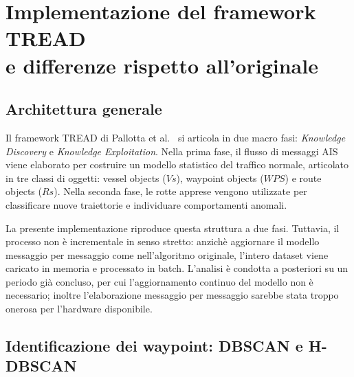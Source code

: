 \section[Implementazione del framework TREAD\texorpdfstring{\protect\newline}{} e differenze rispetto all'originale]%
        {Implementazione del framework TREAD\\ e differenze rispetto all'originale}\label{sec:meth_algorithm}

\subsection{Architettura generale}\label{ssec:meth_architecture}

Il framework TREAD di Pallotta et al.~\cite{pallotta} si articola in due macro fasi: \emph{Knowledge Discovery} e \emph{Knowledge Exploitation}.
Nella prima fase, il flusso di messaggi AIS viene elaborato per costruire un modello statistico del traffico normale, articolato in tre classi
di oggetti: vessel objects ($Vs$), waypoint objects ($WPS$) e route objects ($Rs$).
Nella seconda fase, le rotte apprese vengono utilizzate per classificare nuove traiettorie e individuare comportamenti anomali.

La presente implementazione riproduce questa struttura a due fasi. Tuttavia, il processo non è incrementale in senso stretto:
anzichè aggiornare il modello messaggio per messaggio come nell'algoritmo originale, l'intero dataset viene caricato in memoria
e processato in batch. L'analisi è condotta a posteriori su un periodo già concluso, per cui l'aggiornamento continuo del modello non è necessario;
inoltre l'elaborazione messaggio per messaggio sarebbe stata troppo onerosa per l'hardware disponibile.


\subsection{Identificazione dei waypoint: DBSCAN e H-DBSCAN}\label{ssec:meth_clustering}

